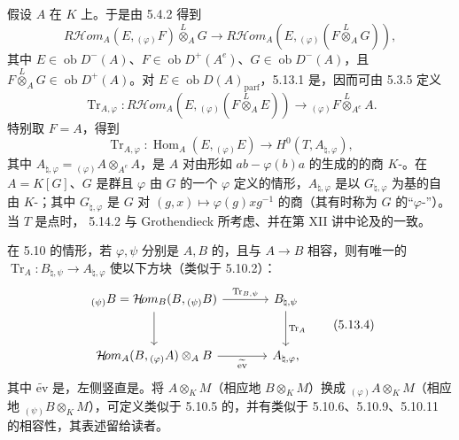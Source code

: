 假设 $A$ 在 $K$ 上。于是由 5.4.2 得到
\begin{equation}R\mathcal{H}\!om_A(E,{}_{(\varphi)}F)\overset L\otimes_A G\longrightarrow R\mathcal{H}\!om_A(E,{}_{(\varphi)}(F\overset L\otimes_A G)),\tag{5.13.1}\end{equation}
其中 $E\in\operatorname{ob}D^-(A)$、$F\in\operatorname{ob}D^+(A^e)$、$G\in\operatorname{ob}D^-(A)$，且 $F\overset L\otimes_A G\in\operatorname{ob}D^+(A)$。对 $E\in\operatorname{ob}D(A)_{\mathrm{parf}}$，5.13.1 是，因而可由 5.3.5 定义
\begin{equation}\operatorname{Tr}_{A,\varphi}:R\mathcal{H}\!om_A(E,{}_{(\varphi)}(F\overset L\otimes_A E))\longrightarrow{}_{(\varphi)}F\overset L\otimes_{A^e}A.\tag{5.13.2}\end{equation}
特别取 $F=A$，得到
\begin{equation}\operatorname{Tr}_{A,\varphi}:\operatorname{Hom}_A(E,{}_{(\varphi)}E)\longrightarrow H^0(T,A_{\natural,\varphi}),\tag{5.13.3}\end{equation}
其中 $A_{\natural,\varphi}={}_{(\varphi)}A\otimes_{A^e}A$，是 $A$ 对由形如 $ab-\varphi(b)a$ 的生成的的商 $K$-。在 $A=K[G]$、$G$ 是群且 $\varphi$ 由 $G$ 的一个 $\varphi$ 定义的情形，$A_{\natural,\varphi}$ 是以 $G_{\natural,\varphi}$ 为基的自由 $K$-；其中 $G_{\natural,\varphi}$ 是 $G$ 对 $(g,x)\mapsto\varphi(g)xg^{-1}$ 的商（其有时称为 $G$ 的“$\varphi$-”）。当 $T$ 是点时， 5.14.2 与 Grothendieck 所考虑、并在第 XII 讲中论及的一致。

在 5.10 的情形，若 $\varphi,\psi$ 分别是 $A,B$ 的，且与 $A\to B$ 相容，则有唯一的 $\operatorname{Tr}_A:B_{\natural,\psi}\to A_{\natural,\varphi}$ 使以下方块（类似于 5.10.2）：
\begin{equation}\begin{tikzcd}[column sep=large,row sep=large]
{}_{(\psi)}B=\mathcal{H}\!om_B(B,{}_{(\psi)}B)\arrow[r,"{\operatorname{Tr}_{B,\psi}}"]\arrow[d] & B_{\natural,\psi}\arrow[d,"\operatorname{Tr}_A"]\\
\mathcal{H}\!om_A(B,{}_{(\varphi)}A)\otimes_A B\arrow[r,"\widetilde{\mathrm{ev}}"'] & A_{\natural,\varphi},
\end{tikzcd}\tag{5.13.4}\end{equation}
其中 $\widetilde{\mathrm{ev}}$ 是，左侧竖直是。将 $A\otimes_K M$（相应地
$B\otimes_K M$）换成 ${}_{(\varphi)}A\otimes_K M$（相应地 ${}_{(\psi)}B\otimes_K M$），可定义类似于 5.10.5 的，并有类似于 5.10.6、5.10.9、5.10.11 的相容性，其表述留给读者。

